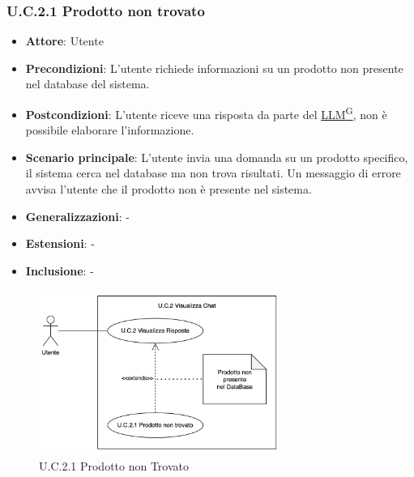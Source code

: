 \subsubsection{U.C.2.1 Prodotto non trovato}
\begin{itemize}
    \item \textbf{Attore}: Utente
    \item \textbf{Precondizioni}: L'utente richiede informazioni su un prodotto non presente nel database del sistema.
    \item \textbf{Postcondizioni}: L'utente riceve una risposta da parte del \href{https://code7crusaders.github.io/docs/PB/documentazione_interna/glossario.html#llm-large-language-model}{LLM\textsuperscript{G}}, non è possibile elaborare l'informazione.
    \item \textbf{Scenario principale}: L'utente invia una domanda su un prodotto specifico, il sistema cerca nel database ma non trova risultati. Un messaggio di errore avvisa l'utente che il prodotto non è presente nel sistema.
    \item \textbf{Generalizzazioni}: -
    \item \textbf{Estensioni}: -
    \item \textbf{Inclusione}: -
\end{itemize}
\begin{figure}[H]
    \centering
    \includegraphics[width=0.7\textwidth]{img/UC2.1.png}
    \caption{U.C.2.1 Prodotto non Trovato}
\end{figure}
\newpage
 
